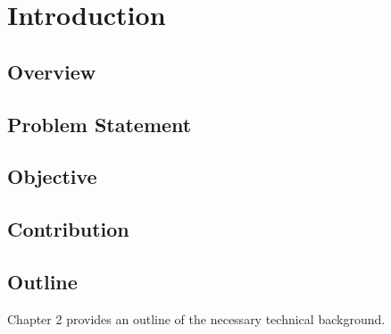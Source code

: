 \chapter{Introduction}

\section{Overview}



\section{Problem Statement}



\section{Objective}



\section{Contribution}



\section{Outline}

Chapter 2 provides an outline of the necessary technical background.
